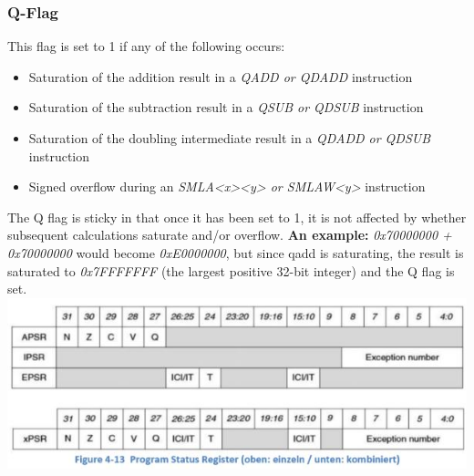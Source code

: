 \subsubsection{Q-Flag}
This flag is set to 1 if any of the following occurs:
\begin{itemize}
    \item Saturation of the addition result in a \textit{QADD or QDADD} instruction
    \item Saturation of the subtraction result in a \textit{QSUB or QDSUB} instruction
    \item Saturation of the doubling intermediate result in a \textit{QDADD or QDSUB} instruction
    \item Signed overflow during an \textit{SMLA<x><y> or SMLAW<y>} instruction
\end{itemize}
The Q flag is sticky in that once it has been set to 1, it is not affected by whether subsequent calculations saturate and/or overflow.\newline
\textbf{An example:}\newline
\textit{0x70000000 + 0x70000000} would become \textit{0xE0000000}, but since qadd is saturating, the result is saturated to \textit{0x7FFFFFFF} (the largest positive 32-bit integer) and the Q flag is set.
\clearpage
\includegraphics[width=17cm]{images/programstatusregister}

